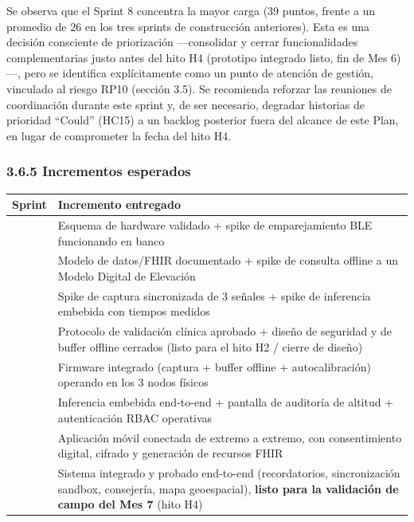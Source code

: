 \documentclass[11pt,a4paper]{article}
\begin{document}
Se observa que el Sprint 8 concentra la mayor carga (39 puntos, frente a un promedio de 26 en los tres sprints de construcción anteriores). Esta es una decisión consciente de priorización ---consolidar y cerrar funcionalidades complementarias justo antes del hito H4 (prototipo integrado listo, fin de Mes 6)---, pero se identifica explícitamente como un punto de atención de gestión, vinculado al riesgo RP10 (sección 3.5). Se recomienda reforzar las reuniones de coordinación durante este sprint y, de ser necesario, degradar historias de prioridad ``Could'' (HC15) a un backlog posterior fuera del alcance de este Plan, en lugar de comprometer la fecha del hito H4.

\subsubsection{3.6.5 Incrementos esperados}\label{incrementos-esperados}

{\small
\begin{longtable}[]{@{}
  >{\raggedright\arraybackslash}p{}
  >{\raggedright\arraybackslash}p{}@{}}
\toprule\noalign{}
\begin{minipage}[b]{\linewidth}\raggedright
Sprint
\end{minipage} & \begin{minipage}[b]{\linewidth}\raggedright
Incremento entregado
\end{minipage} \\
\midrule\noalign{}
\endhead
\bottomrule\noalign{}
\endlastfoot
1 & Esquema de hardware validado + spike de emparejamiento BLE funcionando en banco \\
2 & Modelo de datos/FHIR documentado + spike de consulta offline a un Modelo Digital de Elevación \\
3 & Spike de captura sincronizada de 3 señales + spike de inferencia embebida con tiempos medidos \\
4 & Protocolo de validación clínica aprobado + diseño de seguridad y de buffer offline cerrados (listo para el hito H2 / cierre de diseño) \\
5 & Firmware integrado (captura + buffer offline + autocalibración) operando en los 3 nodos físicos \\
6 & Inferencia embebida end-to-end + pantalla de auditoría de altitud + autenticación RBAC operativas \\
7 & Aplicación móvil conectada de extremo a extremo, con consentimiento digital, cifrado y generación de recursos FHIR \\
8 & Sistema integrado y probado end-to-end (recordatorios, sincronización sandbox, consejería, mapa geoespacial), \textbf{listo para la validación de campo del Mes 7} (hito H4) \\
\end{longtable}
}
\end{document}
